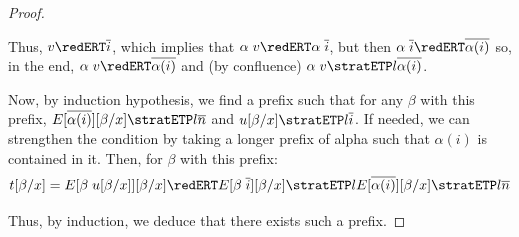 \begin{proof}
\begin{itemize}
    Thus, $v \redERT \overline i$, which implies that $\alpha\;v \redERT \alpha \;\overline i$, but then $\alpha\;\overline i \redERT \overline{\alpha(i)}$ so, in the end,
    $\alpha\;v \redERT \overline{\alpha(i)}$ and (by confluence)
    $\alpha\;v \stratETP l \overline{\alpha(i)}$.

    Now, by induction hypothesis, we find a prefix such that for any $\beta$ with this prefix, $E[\overline{\alpha(i)}][\beta/x] \stratETP l \overline n$ and $u[\beta/x] \stratETP l \overline i$. If needed, we can strengthen the condition by taking a longer prefix of alpha such that $\alpha(i)$ is contained in it. Then, for $\beta$ with this prefix:
    \[t[\beta/x] = E[\beta\;u[\beta/x]][\beta/x] \redERT E[\beta\;\overline i][\beta/x]\stratETP l E[\overline{\alpha(i)}][\beta/x]\stratETP l \overline{n}\]
  \end{itemize}

  Thus, by induction, we deduce that there exists such a prefix.
\end{proof}

